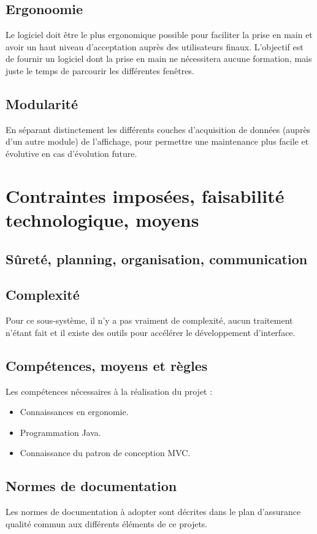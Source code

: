 \subsection{Ergonoomie}
Le logiciel doit être le plus ergonomique possible pour faciliter la prise en main et avoir un haut niveau d'acceptation auprès des utilisateurs finaux. L'objectif est de fournir un logiciel dont la prise en main ne nécessitera aucune formation, mais juste le temps de parcourir les différentes fenêtres.

\subsection{Modularité}
En séparant distinctement les différents couches d'acquisition de données (auprès d'un autre module) de l'affichage, pour permettre une maintenance plus facile et évolutive en cas d'évolution future.

\section{Contraintes imposées, faisabilité technologique, moyens}
\subsection{Sûreté, planning, organisation, communication}

\subsection{Complexité}
Pour ce sous-système, il n'y a pas vraiment de complexité, aucun traitement n'étant fait et il existe des outils pour accélérer le développement d'interface.

\subsection{Compétences, moyens et règles}
Les compétences nécessaires à la réalisation du projet :

\begin{itemize}
\item Connaissances en ergonomie.
\item Programmation Java.
\item Connaissance du patron de conception MVC.
\end{itemize}

\subsection{Normes de documentation}
Les normes de documentation à adopter sont décrites dans le plan d'assurance qualité commun aux différents éléments de ce projets.

